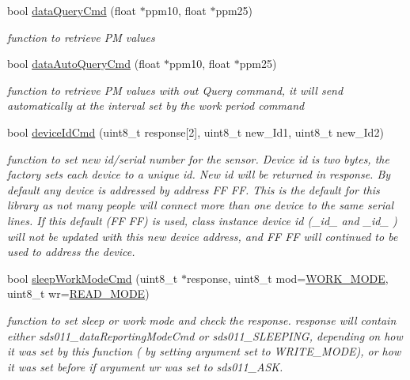 \begin{DoxyCompactItemize}
bool \mbox{\hyperlink{classsds011_a1416e1fd84eea84ea4d3cdf8a3da8041}{data\+Query\+Cmd}} (float $\ast$ppm10, float $\ast$ppm25)
\begin{DoxyCompactList}\small\item\em function to retrieve PM values \end{DoxyCompactList}\item 
bool \mbox{\hyperlink{classsds011_aa166632fddcea1c7841e3578c1c7678c}{data\+Auto\+Query\+Cmd}} (float $\ast$ppm10, float $\ast$ppm25)
\begin{DoxyCompactList}\small\item\em function to retrieve PM values with out Query command, it will send automatically at the interval set by the work period command \end{DoxyCompactList}\item 
bool \mbox{\hyperlink{classsds011_a7adab4f4b33b7e9f517dc9179086b6ed}{device\+Id\+Cmd}} (uint8\+\_\+t response\mbox{[}2\mbox{]}, uint8\+\_\+t new\+\_\+\+Id1, uint8\+\_\+t new\+\_\+\+Id2)
\begin{DoxyCompactList}\small\item\em function to set new id/serial number for the sensor. Device id is two bytes, the factory sets each device to a unique id. New id will be returned in response. By default any device is addressed by address FF FF. This is the default for this library as not many people will connect more than one device to the same serial lines. If this default (FF FF) is used, class instance device id (\+\_\+id\+\_ and \+\_\+id\+\_ ) will not be updated with this new device address, and FF FF will continued to be used to address the device. \end{DoxyCompactList}\item 
bool \mbox{\hyperlink{classsds011_ad9ddddbcb9213f2b0674dee5fb47a5de}{sleep\+Work\+Mode\+Cmd}} (uint8\+\_\+t $\ast$response, uint8\+\_\+t mod=\mbox{\hyperlink{sds011lib_8h_a6999479ba92a931638a17a00c35a5234}{W\+O\+R\+K\+\_\+\+M\+O\+DE}}, uint8\+\_\+t wr=\mbox{\hyperlink{sds011lib_8h_a064cc7153fdb5596b2079d865dd9e055}{R\+E\+A\+D\+\_\+\+M\+O\+DE}})
\begin{DoxyCompactList}\small\item\em function to set sleep or work mode and check the response. response will contain either sds011\+\_\+data\+Reporting\+Mode\+Cmd or sds011\+\_\+\+S\+L\+E\+E\+P\+I\+NG, depending on how it was set by this function ( by setting argument set to W\+R\+I\+T\+E\+\_\+\+M\+O\+DE), or how it was set before if argument wr was set to sds011\+\_\+\+A\+SK. \end{DoxyCompactList}\item 

\end{DoxyCompactItemize}

